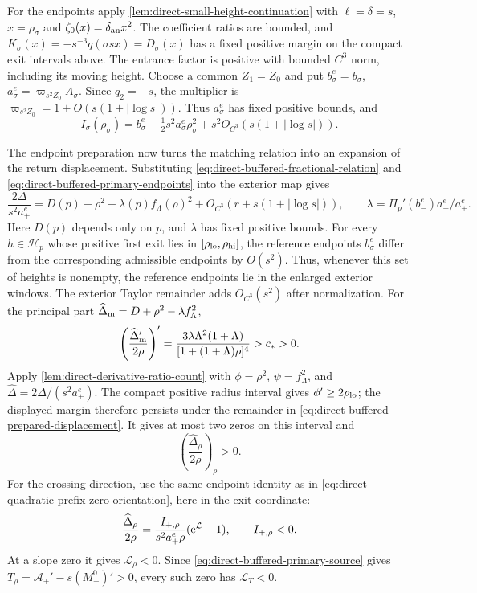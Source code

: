 For the endpoints apply \cref{lem:direct-small-height-continuation}
with \(\ell=\delta=s\), \(x=\rho_\sigma\) and
\(\zeta_0(x)=\delta_{\rm an}x^2\). The coefficient ratios are bounded,
and \(K_\sigma(x)=-s^{-3}q(\sigma sx)=D_\sigma(x)\) has a fixed
positive margin on the compact exit intervals above. The entrance
factor is positive with bounded \(C^3\) norm, including its moving
height. Choose a common \(Z_1=Z_0\) and put
\(b_\sigma^e=b_\sigma\), \(a_\sigma^e=\varpi_{s^2Z_0}A_\sigma\).
Since \(q_2=-s\), the multiplier is
\(\varpi_{s^2Z_0}=1+O(s(1+|\log s|))\). Thus \(a_\sigma^e\) has fixed
positive bounds, and
\begin{equation}
\label{eq:direct-buffered-primary-endpoints}
 I_\sigma(\rho_\sigma)=b_\sigma^e
       -\tfrac12s^2a_\sigma^e\rho_\sigma^2
       +s^2O_{C^3}(s(1+|\log s|)).
\end{equation}

The endpoint preparation now turns the matching relation into an
expansion of the return displacement. Substituting
\eqref{eq:direct-buffered-fractional-relation} and
\eqref{eq:direct-buffered-primary-endpoints} into the exterior map gives
\begin{equation}
\label{eq:direct-buffered-prepared-displacement}
 \frac{2\Delta}{s^2a_+^e}
 =D(p)+\rho^2-\lambda(p)f_\Lambda(\rho)^2
                 +O_{C^3}(r+s(1+|\log s|)),
 \qquad
 \lambda=\Pi_p'(b_-^e)a_-^e/a_+^e .
\end{equation}
Here \(D(p)\) depends only on \(p\), and \(\lambda\) has fixed positive
bounds. For every \(h\in\mathcal H_p\) whose positive first exit lies in
\([\rho_{\rm lo},\rho_{\rm hi}]\), the reference endpoints \(b_\sigma^e\)
differ from the corresponding admissible endpoints by \(O(s^2)\).
Thus, whenever this set of heights is nonempty, the reference endpoints
lie in the enlarged exterior windows. The exterior Taylor remainder adds
\(O_{C^3}(s^2)\) after normalization.
For the principal part \(\widehat\Delta_{\rm m}=D+\rho^2-\lambda f_\Lambda^2\),
\[
 \left(\frac{\widehat\Delta_{\rm m}'}{2\rho}\right)'
 =\frac{3\lambda\Lambda^2(1+\Lambda)}
             {[1+(1+\Lambda)\rho]^4}>c_*>0 .
\]
Apply \cref{lem:direct-derivative-ratio-count} with
\(\phi=\rho^2\), \(\psi=f_\Lambda^2\), and
\(\widehat\Delta=2\Delta/(s^2a_+^e)\). The compact positive radius
interval gives \(\phi'\ge2\rho_{\rm lo}\); the displayed margin
therefore persists under the remainder in
\eqref{eq:direct-buffered-prepared-displacement}. It gives at most two
zeros on this interval and
\[
 \left(\frac{\widehat\Delta_\rho}{2\rho}\right)_\rho>0.
\]
For the crossing direction, use the same endpoint identity as in
\eqref{eq:direct-quadratic-prefix-zero-orientation}, here in the exit
coordinate:
\[
 \frac{\widehat\Delta_\rho}{2\rho}
 =\frac{I_{+,\rho}}{s^2a_+^e\rho}(\mathrm e^{\mathcal L}-1),
 \qquad I_{+,\rho}<0.
\]
At a slope zero it gives \(\mathcal L_\rho<0\). Since
\eqref{eq:direct-buffered-primary-source} gives
\(T_\rho=\mathcal A_+'-s(M_+^0)'>0\), every such zero has
\(\mathcal L_T<0\).

